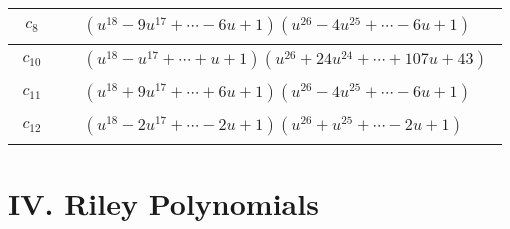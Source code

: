 \documentclass[1p]{elsarticle_modified}
\theoremstyle{definition}
\begin{document}
\begin{tabular}{m{50pt}|m{274pt}}
\hline $$\begin{aligned}c_{8}\end{aligned}$$&$\begin{aligned}
&(u^{18}-9 u^{17}+\cdots-6 u+1)(u^{26}-4 u^{25}+\cdots-6 u+1)
\end{aligned}$\\
\hline $$\begin{aligned}c_{10}\end{aligned}$$&$\begin{aligned}
&(u^{18}- u^{17}+\cdots+u+1)(u^{26}+24 u^{24}+\cdots+107 u+43)
\end{aligned}$\\
\hline $$\begin{aligned}c_{11}\end{aligned}$$&$\begin{aligned}
&(u^{18}+9 u^{17}+\cdots+6 u+1)(u^{26}-4 u^{25}+\cdots-6 u+1)
\end{aligned}$\\
\hline $$\begin{aligned}c_{12}\end{aligned}$$&$\begin{aligned}
&(u^{18}-2 u^{17}+\cdots-2 u+1)(u^{26}+u^{25}+\cdots-2 u+1)
\end{aligned}$\\
\hline
\end{tabular}\newpage\renewcommand{\arraystretch}{1}
\centering \section*{ IV. Riley Polynomials}
\end{document}
